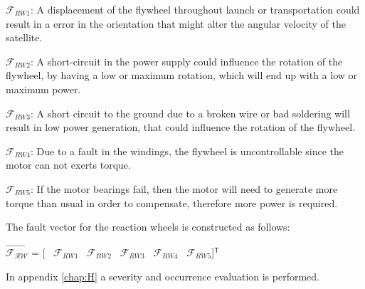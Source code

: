 $\mathcal{F}_{RW1}$: 
A displacement of the flywheel throughout launch or transportation could result in a error in the orientation that might alter the angular velocity of the satellite.

$\mathcal{F}_{RW2}$: 
A short-circuit in the power supply could influence the rotation of the flywheel, by having a low or maximum rotation, which will end up with a low or maximum power.

$\mathcal{F}_{RW3}$:
A short circuit to the ground due to a broken wire or bad soldering will result in low power generation, that could influence the rotation of the flywheel.

$\mathcal{F}_{RW4}$:  
Due to a fault in the windings, the flywheel is uncontrollable since the motor can not exerts torque.

$\mathcal{F}_{RW5}$:  
If the motor bearings fail, then the motor will need to generate more torque than usual in order to compensate, therefore more power is required.

The fault vector for the reaction wheels is constructed as follows:

$\mathcal {\vec{{F}_{RW}}}$ = [ \ $\mathcal{F}_{RW1}$ \ $\mathcal{F}_{RW2}$ \ $\mathcal{F}_{RW3}$ \ $\mathcal{F}_{RW4}$ \ $\mathcal{F}_{RW5}$]$^ \mathsf{T}$

In appendix \ref{chap:H} a severity and occurrence evaluation is performed.
